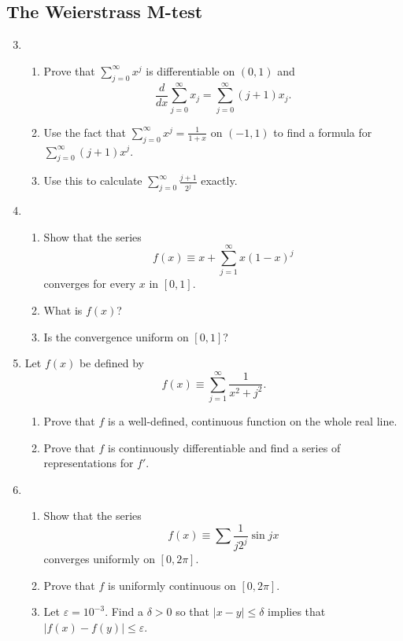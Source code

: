 \documentclass{article}
\begin{document}
\subsection{The Weierstrass M-test}

\begin{enumerate}
    \setcounter{enumi}{2}
    \item \begin{enumerate}
              \item Prove that $\sum_{j=0}^\infty x^j$ is differentiable
                    on $(0,1)$ and
                    \[
                        \frac{d}{dx}\sum_{j=0}^\infty x_j= \sum_{j=0}^\infty(j+1)x_j.
                    \]
              \item Use the fact that $\sum_{j=0}^\infty x^j=\frac{1}{1+x}$ on
                    $(-1,1)$ to find a formula for $\sum_{j=0}^\infty(j+1)x^j$.
              \item Use this to calculate $\sum_{j=0}^\infty\frac{j+1}{2^j}$ exactly.
          \end{enumerate}
          \setcounter{enumi}{4}
    \item \begin{enumerate}
              \item Show that the series
                    \[
                        f(x)\equiv x+\sum_{j=1}^\infty x(1-x)^j
                    \]
                    converges for every $x$ in $[0,1]$.
              \item What is $f(x)$?
              \item Is the convergence uniform on $[0,1]$?
          \end{enumerate}
          \setcounter{enumi}{6}
    \item Let $f(x)$ be defined by
          \[
              f(x)\equiv \sum_{j=1}^\infty\frac{1}{x^2+j^2}.
          \]
          \begin{enumerate}
              \item Prove that $f$ is a well-defined, continuous function
                    on the whole real line.
              \item Prove that $f$ is continuously differentiable and find a
                    series of representations for $f'$.
          \end{enumerate}
          \setcounter{enumi}{10}
    \item \begin{enumerate}
              \item Show that the series
                    \[
                        f(x)\equiv \sum \frac{1}{j2^j}\sin jx
                    \]
                    converges uniformly on $[0,2\pi]$.
              \item Prove that $f$ is uniformly continuous on $[0,2\pi]$.
              \item Let $\varepsilon=10^{-3}$. Find a $\delta>0$ so that
                    $\lvert x-y\rvert\leq \delta$ implies that
                    $\lvert f(x)-f(y)\rvert\leq \varepsilon$.
          \end{enumerate}
\end{enumerate}
\end{document}
